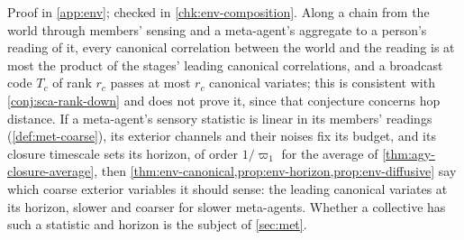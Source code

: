 Proof in \cref{app:env}; checked in \cref{chk:env-composition}. Along a chain from the world through members' sensing and a meta-agent's aggregate to a person's reading of it, every canonical correlation between the world and the reading is at most the product of the stages' leading canonical correlations, and a broadcast code $T_c$ of rank $r_c$ passes at most $r_c$ canonical variates; this is consistent with \cref{conj:sca-rank-down} and does not prove it, since that conjecture concerns hop distance. If a meta-agent's sensory statistic is linear in its members' readings (\cref{def:met-coarse}), its exterior channels and their noises fix its budget, and its closure timescale sets its horizon, of order $1/\varpi_1$ for the average of \cref{thm:agy-closure-average}, then \cref{thm:env-canonical,prop:env-horizon,prop:env-diffusive} say which coarse exterior variables it should sense: the leading canonical variates at its horizon, slower and coarser for slower meta-agents. Whether a collective has such a statistic and horizon is the subject of \cref{sec:met}.

